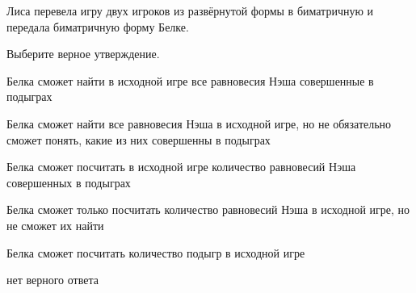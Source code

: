 
\begin{question}
Лиса перевела игру двух игроков из развёрнутой формы в биматричную и передала биматричную форму Белке.

Выберите верное утверждение.
\begin{answerlist}
  \item Белка сможет найти в исходной игре все равновесия Нэша совершенные в подыграх
  \item Белка сможет найти все равновесия Нэша в исходной игре, но не обязательно сможет понять, какие из них совершенны в подыграх
  \item Белка сможет посчитать в исходной игре количество равновесий Нэша совершенных в подыграх
  \item Белка сможет только посчитать количество равновесий Нэша в исходной игре, но не сможет их найти
  \item Белка сможет посчитать количество подыгр в исходной игре
  \item нет верного ответа
\end{answerlist}
\end{question}


